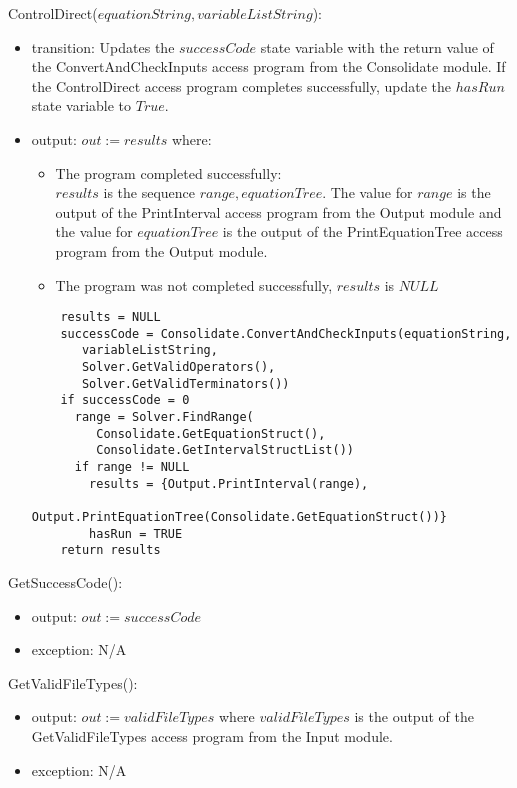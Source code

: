 \documentclass[12pt, titlepage]{article}
\begin{document}
\noindent ControlDirect($equationString, variableListString$):
\begin{itemize}
	\item transition: Updates the $successCode$ state variable with the return 
	value of the ConvertAndCheckInputs access program from the Consolidate 
	module. If the ControlDirect access program completes successfully, update 
	the $hasRun$ state variable to $True$.
	\item output: $out := results$ where:
	\begin{itemize}
		\item The program completed successfully:\\
		$results$ is the sequence $range, equationTree$. The value for $range$ 
		is the output of the PrintInterval access program from the Output 
		module and the value for $equationTree$ is the output of the 
		PrintEquationTree access program from the Output module.
		\item The program was not completed successfully, $results$ is $NULL$
	\end{itemize} 

	\begin{lstlisting}
	results = NULL
	successCode = Consolidate.ConvertAndCheckInputs(equationString, 
	   variableListString, 
	   Solver.GetValidOperators(), 
	   Solver.GetValidTerminators())
	if successCode = 0
	  range = Solver.FindRange(
	     Consolidate.GetEquationStruct(), 
	     Consolidate.GetIntervalStructList())
	  if range != NULL
	    results = {Output.PrintInterval(range), 
	               Output.PrintEquationTree(Consolidate.GetEquationStruct())}
	    hasRun = TRUE
	return results
	\end{lstlisting}
\end{itemize}

\noindent GetSuccessCode():
\begin{itemize}
	\item output: $out := successCode$
	\item exception: N/A
\end{itemize}

\noindent GetValidFileTypes():
\begin{itemize}
	\item output: $out := validFileTypes$ where $validFileTypes$ is the output 
	of the GetValidFileTypes access program from the Input module.
	\item exception: N/A
\end{itemize}
\end{document}
